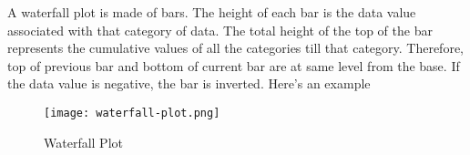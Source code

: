 \begin{tcolorbox}[breakable]
\begin{sol}
\begin{enumerate}
			      A waterfall plot is made of bars. The height of
			      each bar is the data value associated with that
			      category of data. The total height of the top of
			      the bar represents the cumulative values of all the
			      categories till that category. Therefore, top of
			      previous bar and bottom of current bar are at same
			      level from the base. If the data value is negative,
			      the bar is inverted. Here's an example
			      \begin{figure}[H]
				      \centering
				      \texttt{[image: waterfall-plot.png]}
				      \caption{Waterfall Plot}
			      \end{figure}
		\end{enumerate}
	\end{sol}
\end{tcolorbox}
